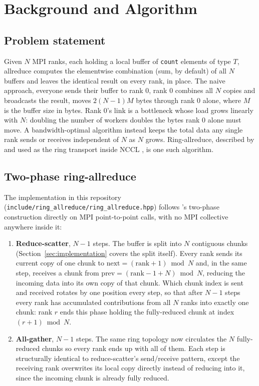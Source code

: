 \section{Background and Algorithm}
\label{sec:background}

\subsection{Problem statement}

Given $N$ MPI ranks, each holding a local buffer of \texttt{count} elements of type $T$, allreduce computes the elementwise combination (sum, by default) of all $N$ buffers and leaves the identical result on every rank, in place. The naive approach, everyone sends their buffer to rank 0, rank 0 combines all $N$ copies and broadcasts the result, moves $2(N-1)M$ bytes through rank 0 alone, where $M$ is the buffer size in bytes. Rank 0's link is a bottleneck whose load grows linearly with $N$: doubling the number of workers doubles the bytes rank 0 alone must move. A bandwidth-optimal algorithm instead keeps the total data any single rank sends or receives independent of $N$ as $N$ grows. Ring-allreduce, described by \citet{patarasuk2009bandwidth} and used as the ring transport inside NCCL \citep{nvidia2024nccl}, is one such algorithm.

\subsection{Two-phase ring-allreduce}

The implementation in this repository (\texttt{include/ring\_allreduce/ring\_allreduce.hpp}) follows \citet{patarasuk2009bandwidth}'s two-phase construction directly on MPI point-to-point calls, with no MPI collective anywhere inside it:

\begin{enumerate}
  \item \textbf{Reduce-scatter}, $N-1$ steps. The buffer is split into $N$ contiguous chunks (Section~\ref{sec:implementation} covers the split itself). Every rank sends its current copy of one chunk to $\text{next} = (\text{rank}+1) \bmod N$ and, in the same step, receives a chunk from $\text{prev} = (\text{rank}-1+N) \bmod N$, reducing the incoming data into its own copy of that chunk. Which chunk index is sent and received rotates by one position every step, so that after $N-1$ steps every rank has accumulated contributions from all $N$ ranks into exactly one chunk: rank $r$ ends this phase holding the fully-reduced chunk at index $(r+1) \bmod N$.
  \item \textbf{All-gather}, $N-1$ steps. The same ring topology now circulates the $N$ fully-reduced chunks so every rank ends up with all of them. Each step is structurally identical to reduce-scatter's send/receive pattern, except the receiving rank overwrites its local copy directly instead of reducing into it, since the incoming chunk is already fully reduced.
\end{enumerate}

